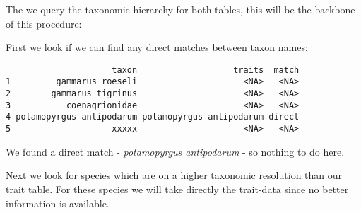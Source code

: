 The we query the taxonomic hierarchy for both tables, this will be the backbone of this procedure:
\begin{knitrout}
\color{fgcolor}\begin{kframe}
\begin{alltt}
 \hlkwb{<-} \hlstd{(}\hlopt{$}
 \hlkwb{<-} \hlstd{(}\hlopt{$}
\end{alltt}
\end{kframe}
\end{knitrout}


First we look if we can find any direct matches between taxon names:
\begin{knitrout}
\color{fgcolor}\begin{kframe}
\begin{alltt}
 \hlkwb{<-} \hlopt{$}\hlopt{$}
\hlopt{$} \hlkwb{<-} \hlopt{$}
\hlopt{$} \hlkwb{<-} \hlstd{(}\hlopt{!} \hlstd{,} \hlstd{)}
\end{alltt}
\begin{verbatim}
                     taxon                   traits  match
1         gammarus roeseli                     <NA>   <NA>
2        gammarus tigrinus                     <NA>   <NA>
3           coenagrionidae                     <NA>   <NA>
4 potamopyrgus antipodarum potamopyrgus antipodarum direct
5                    xxxxx                     <NA>   <NA>
\end{verbatim}
\end{kframe}
\end{knitrout}


We found a direct match - \emph{potamopyrgus antipodarum} - so nothing to do here.


Next we look for species which are on a higher taxonomic resolution than our trait table. 
For these species we will take directly the trait-data since no better information is available.

